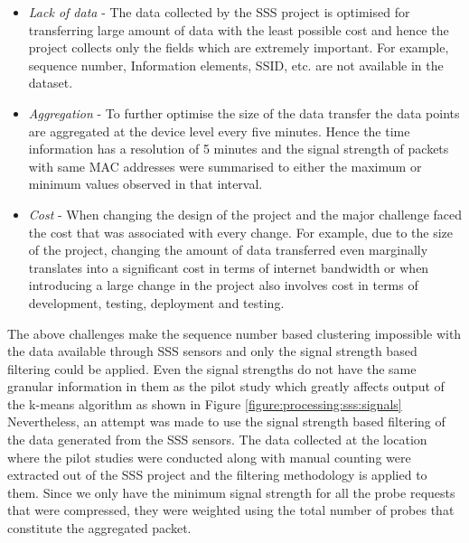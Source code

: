 \begin{itemize}[rightmargin=2em,leftmargin=2em]
  \item \textit{Lack of data} - The data collected by the SSS project is optimised for transferring large amount of data with the least possible cost and hence the project collects only the fields which are extremely important. For example, sequence number, Information elements, SSID, etc. are not available in the dataset.
  \item \textit{Aggregation} - To further optimise the size of the data transfer the data points are aggregated at the device level every five minutes. Hence the time information has a resolution of 5 minutes and the signal strength of packets with same MAC addresses were summarised to either the maximum or minimum values observed in that interval.
  \item \textit{Cost} - When changing the design of the project and the major challenge faced the cost that was associated with every change. For example, due to the size of the project, changing the amount of data transferred even marginally translates into a significant cost in terms of internet bandwidth or when introducing a large change in the project also involves cost in terms of development, testing, deployment and testing.
\end{itemize}

The above challenges make the sequence number based clustering impossible with the data available through SSS sensors and only the signal strength based filtering could be applied. 
Even the signal strengths do not have the same granular information in them as the pilot study which greatly affects output of the k-means algorithm as shown in Figure \ref{figure:processing:sss:signals}
Nevertheless, an attempt was made to use the signal strength based filtering of the data generated from the SSS sensors.
The data collected at the location where the pilot studies were conducted along with manual counting were extracted out of the SSS project and the filtering methodology is applied to them.
Since we only have the minimum signal strength for all the probe requests that were compressed, they were weighted using the total number of probes that constitute the aggregated packet.

